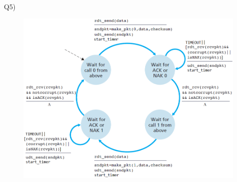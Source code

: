 \documentclass[10pt,letterpaper]{article}
\begin{document}
Q5)

\begin{figure}[ht]
\centering
\includegraphics[width=150mm]{rdtsender_m}
\end{figure}
\end{document}
